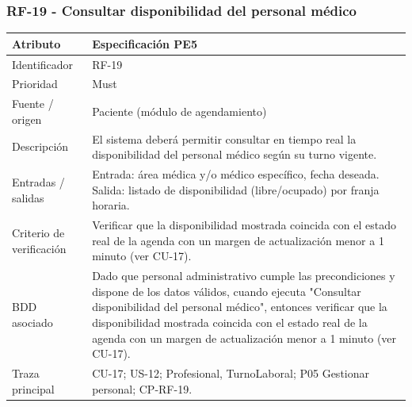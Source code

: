 \documentclass[11pt,a4paper]{article}
\begin{document}
	\subsubsection{RF-19 - Consultar disponibilidad del personal médico}
	\begin{tabularx}{\textwidth}{p{3.2cm}Y}
		\toprule
		\textbf{Atributo} & \textbf{Especificación PE5}\\\midrule
		Identificador & RF-19\\
		Prioridad & Must\\
		Fuente / origen & Paciente (módulo de agendamiento)\\
		Descripción & El sistema deberá permitir consultar en tiempo real la disponibilidad del personal médico según su turno vigente.\\
		Entradas / salidas & Entrada: área médica y/o médico específico, fecha deseada. Salida: listado de disponibilidad (libre/ocupado) por franja horaria.\\
		Criterio de verificación & Verificar que la disponibilidad mostrada coincida con el estado real de la agenda con un margen de actualización menor a 1 minuto (ver CU-17).\\
		BDD asociado & Dado que personal administrativo cumple las precondiciones y dispone de los datos válidos, cuando ejecuta "Consultar disponibilidad del personal médico", entonces verificar que la disponibilidad mostrada coincida con el estado real de la agenda con un margen de actualización menor a 1 minuto (ver CU-17).\\
		Traza principal & CU-17; US-12; Profesional, TurnoLaboral; P05 Gestionar personal; CP-RF-19.\\
		\bottomrule
	\end{tabularx}
\end{document}
